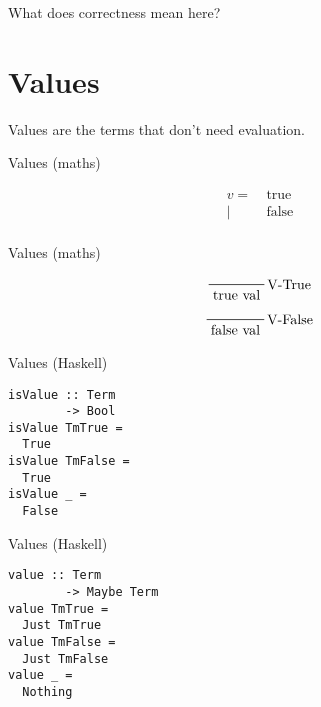 \documentclass[aspectration=169]{beamer}
\begin{document}
\begin{frame}[c]
  \begin{center}
What does correctness mean here?
  \end{center}
\end{frame}

\section{Values}

\begin{frame}[c]
  \begin{center}
   Values are the terms that don't need evaluation. 
  \end{center}
\end{frame}

\begin{frame}[c]
  \begin{center}
Values (maths)
  \end{center}
  \begin{displaymath}
    \begin{aligned}
v =& \ \text{true} \\
  |& \ \text{false}  \\
    \end{aligned}
  \end{displaymath}
\end{frame}

\begin{frame}[c]
  \begin{center}
Values (maths)
  \end{center}
  \begin{displaymath}
    \prftree[r]{V-True}{\text{true val}}
  \end{displaymath}
  \begin{displaymath}
    \prftree[r]{V-False}{\text{false val}}
  \end{displaymath}
\end{frame}

\begin{frame}[fragile]
  \begin{center}
Values (Haskell)
  \end{center}
 \begin{verbatim}
isValue :: Term 
        -> Bool
isValue TmTrue = 
  True
isValue TmFalse = 
  True
isValue _ = 
  False
 \end{verbatim}
\end{frame}

\begin{frame}[fragile]
  \begin{center}
Values (Haskell)
  \end{center}
 \begin{verbatim}
value :: Term 
        -> Maybe Term
value TmTrue = 
  Just TmTrue
value TmFalse = 
  Just TmFalse
value _ = 
  Nothing
 \end{verbatim}
\end{frame}
\end{document}
